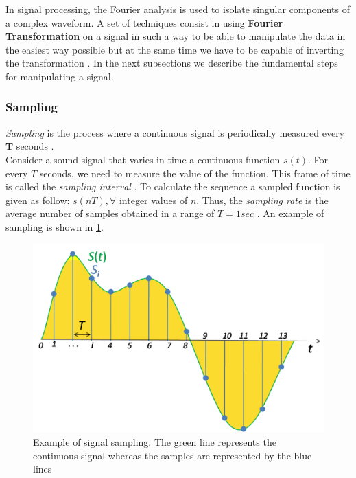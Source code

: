 \noindent In signal processing, the Fourier analysis is used to isolate singular components of a complex waveform. A set of techniques consist in using \textbf{Fourier Transformation} on a signal in such a way to be able to manipulate the data in the easiest way possible but at the same time we have to be capable of inverting the transformation \cite{rabiner1975theory}. In the next subsections we describe the fundamental steps for manipulating a signal.

\subsubsection{Sampling}
\label{ssubs:sampling}

\textit{Sampling} is the process where a continuous signal is periodically measured every \textbf{T} seconds \cite{orfanidis1995introduction}. \\ 
\noindent Consider a sound signal that varies in time a continuous function $s(t)$. For every $T$ seconds, we need to measure the value of the function. This frame of time is called the \textit{sampling interval} \cite{weik2012communications}. To calculate the sequence a sampled function is given as follow: $s(nT), \forall$ integer values of $n$. Thus, the \textit{sampling rate} is the average number of samples obtained in a range of $T = 1sec$ \cite{sampling_wiki}. An example of sampling is shown in \ref{fig:sampling_ex}.

\begin{figure}[!ht]
	\centering
	\includegraphics[scale=0.2]{Figures/sampling_example.png}
	\caption{Example of signal sampling. The green line represents the continuous signal whereas the samples are represented by the blue lines \cite{sampling_wiki}}
	\label{fig:sampling_ex}
\end{figure}

